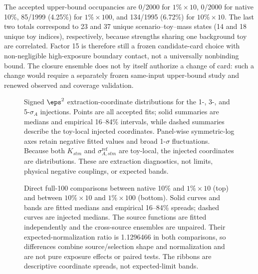 The accepted upper-bound occupancies are 0/2000 for $1\%\times10$, 0/2000 for
native 10\%, 85/1999 (4.25\%) for $1\%\times100$, and 134/1995 (6.72\%) for
$10\%\times10$.  The last two totals correspond to 23 and 37 unique
scenario--toy--mass states (14 and 18 unique toy indices), respectively, because
strengths sharing one background toy are correlated.  Factor 15 is therefore still a frozen candidate-card choice with
non-negligible high-exposure boundary contact, not a universally nonbinding bound.
The closure ensemble does not by itself authorize a change of card: such a change
would require a separately frozen same-input upper-bound study and renewed observed
and coverage validation.

\begin{figure}[p]
\centering
{}
\caption{Signed $\eps^2$ extraction-coordinate distributions for the 1-, 3-, and
5-$\sigma_A$ injections.  Points are all accepted fits; solid summaries are medians
and empirical 16--84\% intervals, while dashed summaries describe the toy-local
injected coordinates.  Panel-wise symmetric-log axes retain negative fitted values
and broad 1-$\sigma$ fluctuations.  Because both $K_{stm}$ and
$\sigma^{\mathrm{ref}}_{A,stm}$ are toy-local, the injected coordinates are
distributions.  These are extraction diagnostics, not limits, physical negative
couplings, or expected bands.}
\label{fig:v4p6-eps2-distributions}
\end{figure}

\begin{figure}[p]
\centering
{}
\caption{Direct full-100 comparisons between native 10\% and $1\%\times10$ (top)
and between $10\%\times10$ and $1\%\times100$ (bottom).  Solid curves and bands are
fitted medians and empirical 16--84\% spreads; dashed curves are injected medians.
The source functions are fitted independently and the cross-source ensembles are
unpaired.  Their expected-normalization ratio is 1.1296466 in both comparisons, so
differences combine source/selection shape and normalization and are not pure exposure
effects or paired tests.  The ribbons are descriptive coordinate spreads, not
expected-limit bands.}
\label{fig:v4p6-direct-eps2-comparisons}
\end{figure}

